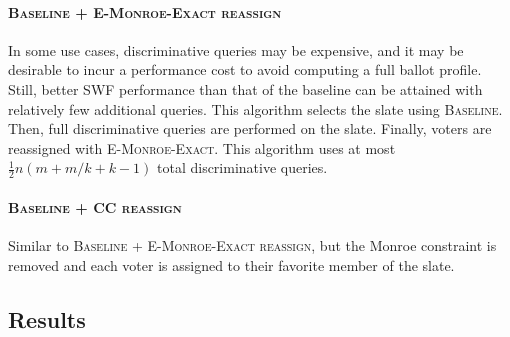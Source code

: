 \documentclass[letterpaper]{article} %
\newcommand{\EExactMonroe}{\textsc{E-Monroe-Exact}}
\newcommand{\Baseline}{\textsc{Baseline}}
\newcommand{\BaselineEMonroeReassign}{\textsc{Baseline + E-Monroe-Exact reassign}}
\newcommand{\BaselineCCReassign}{\textsc{Baseline + CC reassign}}
\begin{document}
\paragraph{\BaselineEMonroeReassign{}}
In some use cases, discriminative queries may be expensive, and it may be desirable to incur a performance cost to avoid computing a full ballot profile.
Still, better SWF performance than that of the baseline can be attained with relatively few additional queries.
This algorithm selects the slate using \Baseline.
Then, full discriminative queries are performed on the slate.
Finally, voters are reassigned with \EExactMonroe{}.
This algorithm uses at most \(\frac{1}{2} n (m + m/k + k - 1)\) total discriminative queries.

\paragraph{\BaselineCCReassign{}}
Similar to \BaselineEMonroeReassign{}, but the Monroe constraint is removed and each voter is assigned to their favorite member of the slate.

\subsection{Results}
\label{sec:voting-results}
\end{document}
